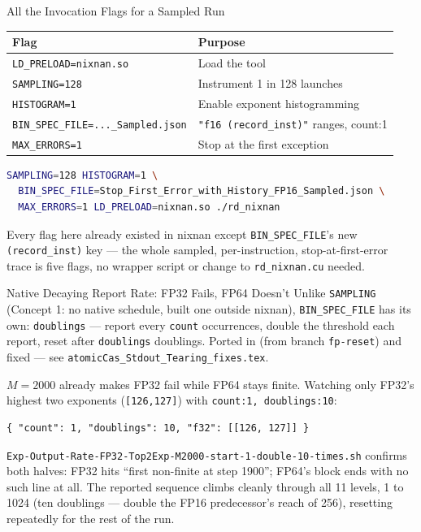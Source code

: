 \documentclass{beamer}
\begin{document}
\begin{frame}[fragile]{All the Invocation Flags for a Sampled Run}
\begin{center}
\begin{tabular}{ll}
\toprule
Flag & Purpose \\
\midrule
\texttt{LD\_PRELOAD=nixnan.so} & Load the tool \\
\texttt{SAMPLING=128} & Instrument 1 in 128 launches \\
\texttt{HISTOGRAM=1} & Enable exponent histogramming \\
\texttt{BIN\_SPEC\_FILE=...\_Sampled.json} & \texttt{"f16 (record\_inst)"} ranges, count:1 \\
\texttt{MAX\_ERRORS=1} & Stop at the first exception \\
\bottomrule
\end{tabular}
\end{center}
\begin{lstlisting}[language=bash]
SAMPLING=128 HISTOGRAM=1 \
  BIN_SPEC_FILE=Stop_First_Error_with_History_FP16_Sampled.json \
  MAX_ERRORS=1 LD_PRELOAD=nixnan.so ./rd_nixnan
\end{lstlisting}
Every flag here already existed in nixnan except \texttt{BIN\_SPEC\_FILE}'s
new \texttt{(record\_inst)} key --- the whole sampled, per-instruction,
stop-at-first-error trace is five flags, no wrapper script or change to
\texttt{rd\_nixnan.cu} needed.
\end{frame}

\begin{frame}[fragile]{Native Decaying Report Rate: FP32 Fails, FP64 Doesn't}
{\small Unlike \texttt{SAMPLING} (Concept 1: no native schedule, built one
outside nixnan), \texttt{BIN\_SPEC\_FILE} has its own: \texttt{doublings}
--- report every \texttt{count} occurrences, double the threshold each
report, reset after \texttt{doublings} doublings. Ported in (from branch
\texttt{fp-reset}) and fixed --- see
\texttt{atomicCas\_Stdout\_Tearing\_fixes.tex}.}

$M{=}2000$ already makes FP32 fail while FP64 stays finite. Watching only
FP32's highest two exponents (\texttt{[126,127]}) with
\texttt{count:1, doublings:10}:
\begin{lstlisting}
{ "count": 1, "doublings": 10, "f32": [[126, 127]] }
\end{lstlisting}
\texttt{Exp-Output-Rate-FP32-Top2Exp-M2000-start-1-double-10-times.sh}
confirms both halves: FP32 hits ``first non-finite at step 1900''; FP64's
block ends with no such line at all. The reported sequence climbs
cleanly through all 11 levels, 1 to 1024 (ten doublings --- double the
FP16 predecessor's reach of 256), resetting repeatedly for the rest of
the run.
\end{frame}
\end{document}
